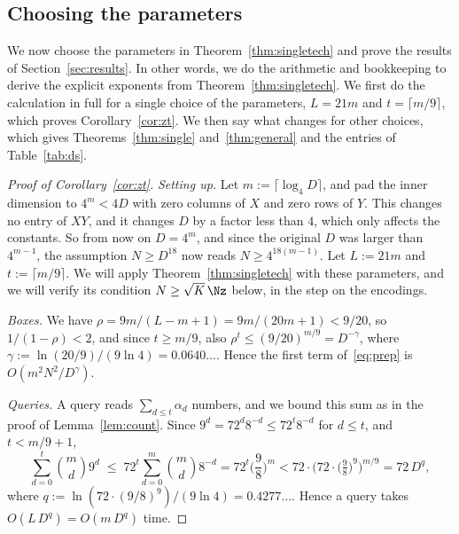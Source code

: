 \subsection{Choosing the parameters}\label{sec:corproofs}

We now choose the parameters in Theorem~\ref{thm:singletech} and prove the results of Section~\ref{sec:results}. In other words, we do the arithmetic and bookkeeping to derive the explicit exponents from Theorem~\ref{thm:singletech}. We first do the calculation in full for a single choice of the parameters, $L=21m$ and $t=\lceil m/9\rceil$, which proves Corollary~\ref{cor:zt}. We then say what changes for other choices, which gives Theorems~\ref{thm:single} and~\ref{thm:general} and the entries of Table~\ref{tab:ds}.

\begin{proof}[Proof of Corollary~\ref{cor:zt}]
\emph{Setting up.} Let $m:=\lceil\log_4D\rceil$, and pad the inner dimension to $4^m<4D$ with zero columns of $X$ and zero rows of $Y$. This changes no entry of $XY$, and it changes $D$ by a factor less than $4$, which only affects the constants. So from now on $D=4^m$, and since the original $D$ was larger than $4^{m-1}$, the assumption $N\ge D^{18}$ now reads $N\ge4^{18(m-1)}$. Let $L:=21m$ and $t:=\lceil m/9\rceil$. We will apply Theorem~\ref{thm:singletech} with these parameters, and we will verify its condition $N\ge\sqrt K\,\Nz$ below, in the step on the encodings.

\emph{Boxes.} We have $\rho=9m/(L-m+1)=9m/(20m+1)<9/20$, so $1/(1-\rho)<2$, and since $t\ge m/9$, also $\rho^t\le(9/20)^{m/9}=D^{-\gamma}$, where $\gamma:=\ln(20/9)/(9\ln4)=0.0640\ldots$. Hence the first term of~\eqref{eq:prep} is $O(m^2N^2/D^{\gamma})$.

\emph{Queries.} A query reads $\sum_{d\le t}\alpha_d$ numbers, and we bound this sum as in the proof of Lemma~\ref{lem:count}. Since $9^d=72^d8^{-d}\le72^t8^{-d}$ for $d\le t$, and $t<m/9+1$,
\[
\sum_{d=0}^{t}\binom md9^d\;\le\;72^t\sum_{d=0}^{m}\binom md8^{-d}=72^t\Big(\frac98\Big)^m<72\cdot\Big(72\cdot\big(\tfrac98\big)^9\Big)^{m/9}=72\,D^{q},
\]
where $q:=\ln(72\cdot(9/8)^9)/(9\ln4)=0.4277\ldots$. Hence a query takes $O(L\,D^{q})=O(m\,D^{q})$ time.


\end{proof}
